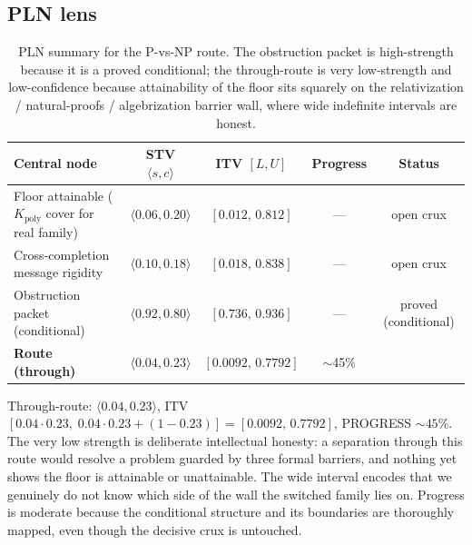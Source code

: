 \subsection*{PLN lens}

\begin{table}[h]
\centering
\small
\begin{tabular}{lcccc}
\toprule
Central node & STV $\langle s,c\rangle$ & ITV $[L,U]$ & Progress & Status \\
\midrule
Floor attainable ($K_{\mathrm{poly}}$ cover for real family) & $\langle 0.06, 0.20\rangle$ & $[0.012,\,0.812]$ & --- & open crux \\
Cross-completion message rigidity & $\langle 0.10, 0.18\rangle$ & $[0.018,\,0.838]$ & --- & open crux \\
Obstruction packet (conditional) & $\langle 0.92, 0.80\rangle$ & $[0.736,\,0.936]$ & --- & proved (conditional) \\
\midrule
\textbf{Route (through)} & $\langle 0.04, 0.23\rangle$ & $[0.0092,\,0.7792]$ & $\sim$45\% & \\
\bottomrule
\end{tabular}
\caption{PLN summary for the P-vs-NP route. The obstruction packet is
high-strength because it is a proved conditional; the through-route is very
low-strength and low-confidence because attainability of the floor sits squarely
on the relativization / natural-proofs / algebrization barrier wall, where wide
indefinite intervals are honest.}
\end{table}

\noindent Through-route: $\langle 0.04, 0.23\rangle$, ITV
$[0.04\cdot 0.23,\;0.04\cdot 0.23+(1-0.23)] = [0.0092,\,0.7792]$,
PROGRESS $\sim 45\%$. The very low strength is deliberate intellectual honesty:
a separation through this route would resolve a problem guarded by three formal
barriers, and nothing yet shows the floor is attainable or unattainable. The
wide interval encodes that we genuinely do not know which side of the wall the
switched family lies on. Progress is moderate because the conditional structure
and its boundaries are thoroughly mapped, even though the decisive crux is
untouched.

